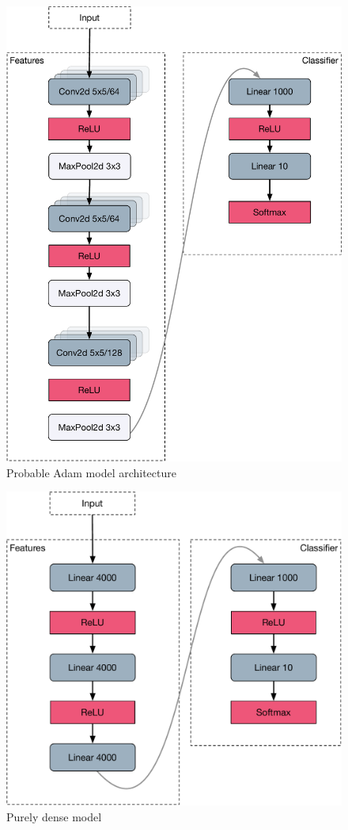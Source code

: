 \begin{figure}
    \centering
    \includegraphics[width=.8\linewidth]{gfx/diagrams/neural_network/adammodel.pdf}
    \caption{Probable Adam model architecture}
    \label{fig:adammodel}
\end{figure}

\begin{figure}
    \centering
    \includegraphics[width=.8\linewidth]{gfx/diagrams/neural_network/fullyconnected.pdf}
    \caption{Purely dense model}
    \label{fig:fully-connected}
\end{figure}

